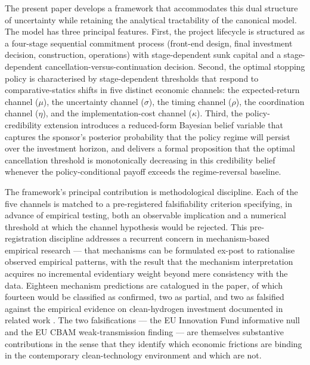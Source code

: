 \documentclass[12pt,a4paper]{article}
\theoremstyle{plain}
\theoremstyle{definition}
\begin{document}
The present paper develops a framework that accommodates this dual structure of uncertainty while retaining the analytical tractability of the canonical model. The model has three principal features. First, the project lifecycle is structured as a four-stage sequential commitment process (front-end design, final investment decision, construction, operations) with stage-dependent sunk capital and a stage-dependent cancellation-versus-continuation decision. Second, the optimal stopping policy is characterised by stage-dependent thresholds that respond to comparative-statics shifts in five distinct economic channels: the expected-return channel ($\mu$), the uncertainty channel ($\sigma$), the timing channel ($\rho$), the coordination channel ($\eta$), and the implementation-cost channel ($\kappa$). Third, the policy-credibility extension introduces a reduced-form Bayesian belief variable that captures the sponsor's posterior probability that the policy regime will persist over the investment horizon, and delivers a formal proposition that the optimal cancellation threshold is monotonically decreasing in this credibility belief whenever the policy-conditional payoff exceeds the regime-reversal baseline.

The framework's principal contribution is methodological discipline. Each of the five channels is matched to a pre-registered falsifiability criterion specifying, in advance of empirical testing, both an observable implication and a numerical threshold at which the channel hypothesis would be rejected. This pre-registration discipline addresses a recurrent concern in mechanism-based empirical research --- that mechanisms can be formulated ex-post to rationalise observed empirical patterns, with the result that the mechanism interpretation acquires no incremental evidentiary weight beyond mere consistency with the data. Eighteen mechanism predictions are catalogued in the paper, of which fourteen would be classified as confirmed, two as partial, and two as falsified against the empirical evidence on clean-hydrogen investment documented in related work \citep{saakstra2026paper2, saakstra2026paper3}. The two falsifications --- the EU Innovation Fund informative null and the EU CBAM weak-transmission finding --- are themselves substantive contributions in the sense that they identify which economic frictions are binding in the contemporary clean-technology environment and which are not.
\end{document}
